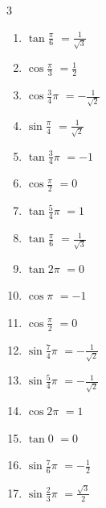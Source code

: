 \begin{multicols}{3}
\begin{enumerate}
  \item $\displaystyle \tan{\frac{\pi}{6}}$
        $\displaystyle =\frac{1}{\sqrt{3}}$

  \item $\displaystyle \cos{\frac{\pi}{3}}$
        $\displaystyle =\frac{1}{2}$

  \item $\displaystyle \cos{\frac{3}{4}\pi}$
        $\displaystyle =-\frac{1}{\sqrt{2}}$

  \item $\displaystyle \sin{\frac{\pi}{4}}$
        $\displaystyle =\frac{1}{\sqrt{2}}$

  \item $\displaystyle \tan{\frac{3}{4}\pi}$
        $\displaystyle =-1$

  \item $\displaystyle \cos{\frac{\pi}{2}}$
        $\displaystyle =0$

  \item $\displaystyle \tan{\frac{5}{4}\pi}$
        $\displaystyle =1$

  \item $\displaystyle \tan{\frac{\pi}{6}}$
        $\displaystyle =\frac{1}{\sqrt{3}}$

  \item $\displaystyle \tan{2\pi}$
        $\displaystyle =0$

  \item $\displaystyle \cos{\pi}$
        $\displaystyle =-1$

  \item $\displaystyle \cos{\frac{\pi}{2}}$
        $\displaystyle =0$

\columnbreak %

  \item $\displaystyle \sin{\frac{7}{4}\pi}$
        $\displaystyle =-\frac{1}{\sqrt{2}}$

  \item $\displaystyle \sin{\frac{5}{4}\pi}$
        $\displaystyle =-\frac{1}{\sqrt{2}}$

  \item $\displaystyle \cos{2\pi}$
        $\displaystyle =1$

  \item $\displaystyle \tan{0}$
        $\displaystyle =0$

  \item $\displaystyle \sin{\frac{7}{6}\pi}$
        $\displaystyle =-\frac{1}{2}$

  \item $\displaystyle \sin{\frac{2}{3}\pi}$
        $\displaystyle =\frac{\sqrt{3}}{2}$


\end{enumerate}
\end{multicols}

